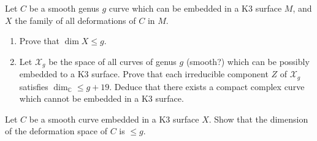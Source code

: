 \begin{exercise}
\label{exercise-deformations-of-curves-in-K3}
Let $C$ be a smooth genus $g$ curve which can
be embedded in a K3 surface  $M$,
and $X$ the family of all deformations of $C$
in $M$.
\begin{enumerate}
\item Prove that $\dim X \leq  g$.
\item Let $\mathcal{X}_g$ be the space of all
curves of genus $g$ (smooth?)
which can be possibly embedded to a K3
surface. Prove that each irreducible
component $Z$ of $\mathcal{X}_g$ satisfies
$\dim_\mathbb{C} \leq  g+19$. Deduce
that there exists a compact complex curve
which cannot be embedded in a K3
surface.
\end{enumerate}
\end{exercise}

\begin{exercise}
\label{exercise-}
Let $C$ be a smooth curve embedded in a K3
surface $X$. Show that the dimension
of the deformation space of $C$ is $\leq g$.
\end{exercise}

